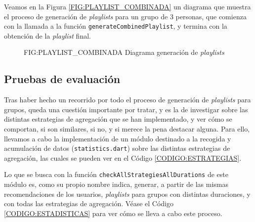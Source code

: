 Veamos en la Figura \ref{FIG:PLAYLIST_COMBINADA} un diagrama que muestra el proceso de generación de \textit{playlists} para un grupo de 3 personas, que comienza 
con la llamada a la función \texttt{generateCombinedPlaylist}, y termina con la obtención de la \textit{playlist} final.

\begin{figure}[Diagrama generación de \textit{playlists}]{FIG:PLAYLIST_COMBINADA}
  {Diagrama generación de \textit{playlists}}
\end{figure}

\newpage

\subsection{Pruebas de evaluación\label{SEC:PRUEBAS_EVALUACION_IMPLEMENTACION}}

Tras haber hecho un recorrido por todo el proceso de generación de \textit{playlists} para grupos, queda una cuestión importante por tratar, y es
la de investigar sobre las distintas estrategias de agregación que se han implementado, y ver cómo se comportan, si son similares, si no, y si merece la pena 
destacar alguna. Para ello, llevamos a cabo la implementación de un módulo destinado a la recogida y acumulación de datos (\texttt{statistics.dart}) sobre 
las distintas estrategias de agregación, las cuales se pueden ver en el Código \ref{CODIGO:ESTRATEGIAS}.

Lo que se busca con la función \texttt{checkAllStrategiesAllDurations}  de este módulo es, como su propio nombre indica, generar, a partir de las 
mismas recomendaciones de los usuarios, \textit{playlists} para grupos con distintas duraciones, y con todas las estrategias de agregación.
Véase el Código \ref{CODIGO:ESTADISTICAS} para ver cómo se lleva a cabo este proceso.

